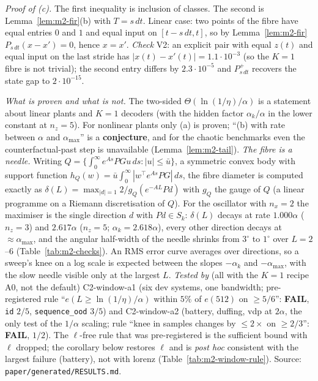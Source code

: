 \noindent\emph{Proof of (c).} The first inequality is inclusion of classes. The second is Lemma~\ref{lem:m2-fir}(b) with
$T=s\,dt$. Linear case: two points of the fibre have equal entries $0$ and $1$ and equal input on $[t-s\,dt,t]$, so by
Lemma~\ref{lem:m2-fir} $P_{s\,dt}(x-x')=0$, hence $x=x'$. \emph{Check} V2: an explicit pair with equal $z(t)$ and equal
input on the last stride has $|x(t)-x'(t)|=1.1\cdot10^{-3}$ (so the $K=1$ fibre is not trivial); the second entry differs
by $2.3\cdot10^{-5}$ and $P_{s\,dt}^+$ recovers the state gap to $2\cdot10^{-15}$.

\emph{What is proven and what is not.} The two-sided $\Theta(\ln(1/\eta)/\alpha)$ is a statement about linear plants and $K=1$ decoders
(with the hidden factor $\alpha_k/\alpha$ in the lower constant at $n_z=5$). For nonlinear plants only (a) is proven;
``(b) with rate between $\alpha$ and $\alpha_{\max}$'' is a \textbf{conjecture}, and for the chaotic benchmarks even
the counterfactual-past step is unavailable (Lemma~\ref{lem:m2-tail}). \emph{The fibre is a needle.} Writing
$Q=\{\int_0^\infty e^{As}PGu\,ds:|u|\le\bar u\}$, a symmetric convex body with support function
$h_Q(w)=\bar u\int_0^\infty|w^\top e^{As}PG|\,ds$, the fibre diameter is computed exactly as
$\delta(L)=\max_{|d|=1}2/g_Q(e^{-AL}Pd)$ with $g_Q$ the gauge of $Q$ (a linear programme on a Riemann discretisation
of $Q$). For the oscillator with $n_x=2$ the maximiser is the single direction $d$ with $Pd\in S_k$: $\delta(L)$
decays at rate $1.000\alpha$ ($n_z=3$) and $2.617\alpha$ ($n_z=5$; $\alpha_k=2.618\alpha$), every other direction
decays at $\approx\alpha_{\max}$, and the angular half-width of the needle shrinks from $3^\circ$ to $1^\circ$ over
$L=2$--$6$ (Table~\ref{tab:m2-checks}). An RMS error curve averages over directions, so a sweep's knee on a log scale
is expected between the slopes $-\alpha_k$ and $-\alpha_{\max}$, with the slow needle visible only at the largest $L$.
\emph{Tested by} (all with the $K=1$ recipe A0, not the default) C2-window-a1 (six dev systems, one bandwidth; pre-registered rule ``$e(L\ge\ln(1/\eta)/\alpha)$ within
$5\%$ of $e(512)$ on $\ge5/6$'': \textbf{FAIL}, \texttt{id} $2/5$, \texttt{sequence\_ood} $3/5$) and C2-window-a2 (battery,
duffing, vdp at $2\alpha$, the only test of the $1/\alpha$ scaling; rule ``knee in samples changes by $\le2\times$ on
$\ge2/3$'': \textbf{FAIL}, $1/2$). The $\ell$-free rule that was pre-registered is the sufficient bound with $\ell$ dropped;
the corollary below restores $\ell$ and is \emph{post hoc} consistent with the largest failure (battery), not with lorenz
(Table~\ref{tab:m2-window-rule}). Source:
\texttt{paper/generated/RESULTS.md}.

